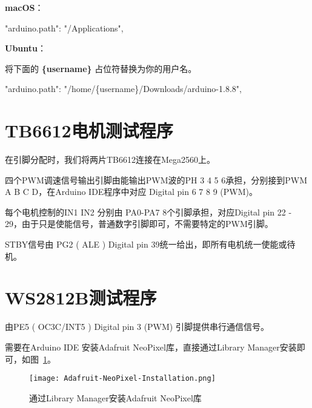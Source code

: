 \begin{enumerate}
        \textbf{macOS}：
    
        \begin{tcolorbox}    
            "arduino.path": "/Applications",
        \end{tcolorbox}

        \textbf{Ubuntu}：
    
        将下面的 \textbf{\{username\}} 占位符替换为你的用户名。
        \begin{tcolorbox}
            "arduino.path": "/home/\{username\}/Downloads/arduino-1.8.8",
        \end{tcolorbox}
    \end{enumerate}



\section{TB6612电机测试程序}

在引脚分配时，我们将两片TB6612连接在Mega2560上。

四个PWM调速信号输出引脚由能输出PWM波的PH 3 4 5 6承担，分别接到PWM A B C D，在Arduino IDE程序中对应 Digital pin 6 7 8 9 (PWM)。

每个电机控制的IN1 IN2 分别由 PA0-PA7 8个引脚承担，对应Digital pin 22 - 29，由于只是使能信号，普通数字引脚即可，不需要特定的PWM引脚。

STBY信号由 PG2 ( ALE ) Digital pin 39统一给出，即所有电机统一使能或待机。

\section{WS2812B测试程序}

由PE5 ( OC3C/INT5 ) Digital pin 3 (PWM) 引脚提供串行通信信号。

需要在Arduino IDE 安装Adafruit NeoPixel库，直接通过Library Manager安装即可，如图~\ref{fig:Adafruit-NeoPixel-Installation}。

\begin{figure}[htbp]
    \centering
    \texttt{[image: Adafruit-NeoPixel-Installation.png]}
    \caption{通过Library Manager安装Adafruit NeoPixel库}
    \label{fig:Adafruit-NeoPixel-Installation}
\end{figure}